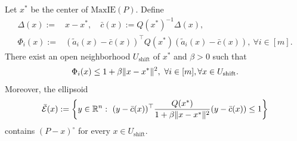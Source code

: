 \documentclass[smallextended]{svjour3}
\newcommand{\R}{\mathbb{R}}
\newcommand{\E}{\mathcal{E}}
\newcommand{\MaxIE}{\mathrm{MaxIE}}
\begin{document}
\begin{lemma} \label{lemma: perturbed_ellip}
    Let $x^*$ be the center of $\MaxIE(P)$. Define
    \begin{align*}
        \Delta(x) := & x-x^*, \quad \bar{c}(x) := Q(x^*)^{-1}\Delta(x), \\
        \Phi_i(x) := & (\tilde{a}_i(x) - \bar{c}(x))^\top Q(x^*)(\tilde{a}_i(x) - \bar{c}(x)), ~\forall i\in [m].
    \end{align*}
    There exist an open neighborhood $U_{\mathrm{shift}}$ of $x^*$ and $\beta > 0$ such that
    \begin{align}
        \Phi_i(x) \leq 1 + \beta \|x-x^*\|^2, ~\forall i\in [m], \forall x\in U_{\mathrm{shift}}. \notag
    \end{align}
    Moreover, the ellipsoid
    \begin{align}
        \bar{\E}(x) := \left\{y\in \R^n:~ (y-\bar{c}(x))^\top \frac{Q(x^*)}{1 +\beta \|x - x^*\|^2} (y-\bar{c}(x))\leq 1 \right\} \notag
    \end{align}
    contains $(P-x)^\circ$ for every $x\in U_{\mathrm{shift}}$.
\end{lemma}
\end{document}
